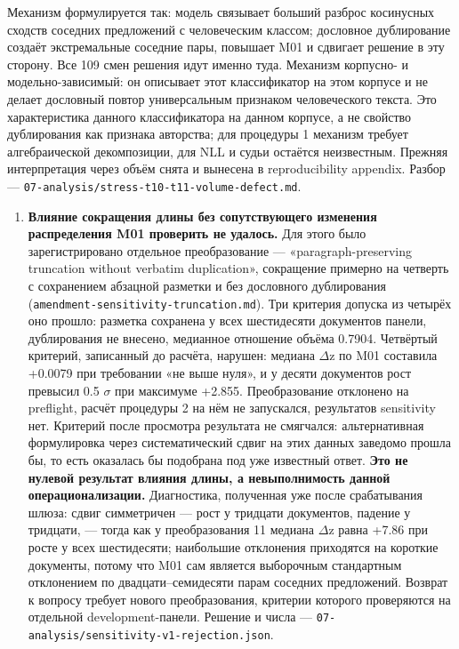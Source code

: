 \documentclass[11pt,a4paper]{article}
\renewcommand{\_}{\textunderscore\allowbreak}
\begin{document}
\begin{enumerate}
Механизм формулируется так: модель связывает больший разброс косинусных сходств соседних предложений с человеческим классом; дословное дублирование создаёт экстремальные соседние пары, повышает M01 и сдвигает решение в эту сторону. Все 109 смен решения идут именно туда. Механизм корпусно- и модельно-зависимый: он описывает этот классификатор на этом корпусе и не делает дословный повтор универсальным признаком человеческого текста. Это характеристика данного классификатора на данном корпусе, а не свойство дублирования как признака авторства; для процедуры 1 механизм требует алгебраической декомпозиции, для NLL и судьи остаётся неизвестным. Прежняя интерпретация через объём снята и вынесена в reproducibility appendix. Разбор — \texttt{07-\allowbreak{}analysis/stress-\allowbreak{}t10-\allowbreak{}t11-\allowbreak{}volume-\allowbreak{}defect.md}.
\end{enumerate}

\begin{enumerate}
\item[26.] \textbf{Влияние сокращения длины без сопутствующего изменения распределения M01 проверить не удалось.} Для этого было зарегистрировано отдельное преобразование — «paragraph-preserving truncation without verbatim duplication», сокращение примерно на четверть с сохранением абзацной разметки и без дословного дублирования (\texttt{amendment-\allowbreak{}sensitivity-\allowbreak{}truncation.md}). Три критерия допуска из четырёх оно прошло: разметка сохранена у всех шестидесяти документов панели, дублирования не внесено, медианное отношение объёма 0.7904. Четвёртый критерий, записанный до расчёта, нарушен: медиана $\Delta$z по M01 составила +0.0079 при требовании «не выше нуля», и у десяти документов рост превысил 0.5 $\sigma$ при максимуме +2.855. Преобразование отклонено на preflight, расчёт процедуры 2 на нём не запускался, результатов sensitivity нет. Критерий после просмотра результата не смягчался: альтернативная формулировка через систематический сдвиг на этих данных заведомо прошла бы, то есть оказалась бы подобрана под уже известный ответ. \textbf{Это не нулевой результат влияния длины, а невыполнимость данной операционализации.} Диагностика, полученная уже после срабатывания шлюза: сдвиг симметричен — рост у тридцати документов, падение у тридцати, — тогда как у преобразования 11 медиана $\Delta$z равна +7.86 при росте у всех шестидесяти; наибольшие отклонения приходятся на короткие документы, потому что M01 сам является выборочным стандартным отклонением по двадцати–семидесяти парам соседних предложений. Возврат к вопросу требует нового преобразования, критерии которого проверяются на отдельной development-панели. Решение и числа — \texttt{07-\allowbreak{}analysis/sensitivity-\allowbreak{}v1-\allowbreak{}rejection.json}.
\end{enumerate}
\end{document}
